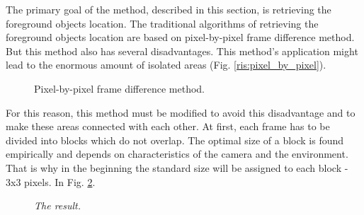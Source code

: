 \documentclass[12pt,a4paper,oneside,titlepage]{article}
\begin{document}
The primary goal of the method, described in this section, is retrieving the foreground objects location.
The traditional algorithms of retrieving the foreground objects location are based on pixel-by-pixel frame difference method.
But this method also has several disadvantages.
This method's application might lead to the enormous amount of isolated areas (Fig. \ref{ris:pixel_by_pixel}).

\begin{figure}[h]
  \vspace{-5ex}
  \caption{Pixel-by-pixel frame difference method.}
  \label{fig:pixel_by_pixel}
\end{figure}

For this reason, this method must be modified to avoid this disadvantage and to make these areas connected with each other.
At first, each frame has to be divided into blocks which do not overlap.
The optimal size of a block is found empirically and depends on characteristics of the camera and the environment.
That is why in the beginning the standard size will be assigned to each block - 3x3 pixels.
In Fig. \ref{fig:fig2}.

\begin{figure}[h]
  \vspace{-5ex}
  \caption{\textit{The result.}}
  \label{fig:fig2}
\end{figure}
\end{document}
